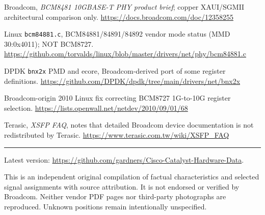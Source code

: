 \documentclass[10pt,a4paper]{article}
\begin{document}
\begin{description}[leftmargin=11mm,labelwidth=9mm,style=nextline]
\item[{[C1]}] Broadcom, \emph{BCM8481 10GBASE-T PHY product brief}; copper XAUI/SGMII architectural comparison only. \url{https://docs.broadcom.com/doc/12358255}
\item[{[C2]}] Linux \texttt{bcm84881.c}, BCM84881/84891/84892 vendor mode status (MMD 30:0x4011); NOT BCM8727. \url{https://github.com/torvalds/linux/blob/master/drivers/net/phy/bcm84881.c}
\item[{[DP]}] DPDK \texttt{bnx2x} PMD and ecore, Broadcom-derived port of some register definitions. \url{https://github.com/DPDK/dpdk/tree/main/drivers/net/bnx2x}
\item[{[Q]}] Broadcom-origin 2010 Linux fix correcting BCM8727 1G-to-10G register selection. \url{https://lists.openwall.net/netdev/2010/09/01/68}
\item[{[F]}] Terasic, \emph{XSFP FAQ}, notes that detailed Broadcom device documentation is not redistributed by Terasic. \url{https://www.terasic.com.tw/wiki/XSFP_FAQ}
\end{description}\fussy
\vspace{2mm}\hrule\vspace{2mm}\footnotesize Latest version: \url{https://github.com/gardners/Cisco-Catalyst-Hardware-Data}.\par This is an independent original compilation of factual characteristics and selected signal assignments with source attribution. It is not endorsed or verified by Broadcom. Neither vendor PDF pages nor third-party photographs are reproduced. Unknown positions remain intentionally unspecified.\normalsize
\end{document}

